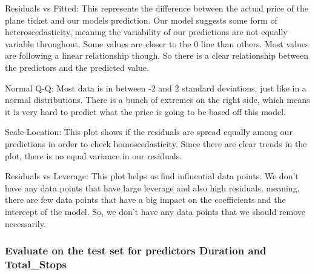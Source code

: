\documentclass[
]{article}
\newenvironment{Shaded}{\begin{snugshade}}{\end{snugshade}}
\newcommand{\AttributeTok}[1]{\textcolor[rgb]{0.77,0.63,0.00}{#1}}
\newcommand{\DecValTok}[1]{\textcolor[rgb]{0.00,0.00,0.81}{#1}}
\newcommand{\FunctionTok}[1]{\textcolor[rgb]{0.00,0.00,0.00}{#1}}
\newcommand{\NormalTok}[1]{#1}
\newcommand{\OtherTok}[1]{\textcolor[rgb]{0.56,0.35,0.01}{#1}}
\newcommand{\SpecialCharTok}[1]{\textcolor[rgb]{0.00,0.00,0.00}{#1}}
\newcommand{\StringTok}[1]{\textcolor[rgb]{0.31,0.60,0.02}{#1}}
\begin{document}
Residuals vs Fitted: This represents the difference between the actual
price of the plane ticket and our models prediction. Our model suggests
some form of heteroscedasticity, meaning the variability of our
predictions are not equally variable throughout. Some values are closer
to the 0 line than others. Most values are following a linear
relationship though. So there is a clear relationship between the
predictors and the predicted value.

Normal Q-Q: Most data is in between -2 and 2 standard deviations, just
like in a normal distributions. There is a bunch of extremes on the
right side, which means it is very hard to predict what the price is
going to be based off this model.

Scale-Location: This plot shows if the residuals are spread equally
among our predictions in order to check homoscedasticity. Since there
are clear trends in the plot, there is no equal variance in our
residuals.

Residuals vs Leverage: This plot helps us find influential data points.
We don't have any data points that have large leverage and also high
residuals, meaning, there are few data points that have a big impact on
the coefficients and the intercept of the model. So, we don't have any
data points that we should remove necessarily.

\hypertarget{evaluate-on-the-test-set-for-predictors-duration-and-total_stops}{%
\subsubsection{Evaluate on the test set for predictors Duration and
Total\_Stops}\label{evaluate-on-the-test-set-for-predictors-duration-and-total_stops}}

\begin{Shaded}
\end{Shaded}
\end{document}
